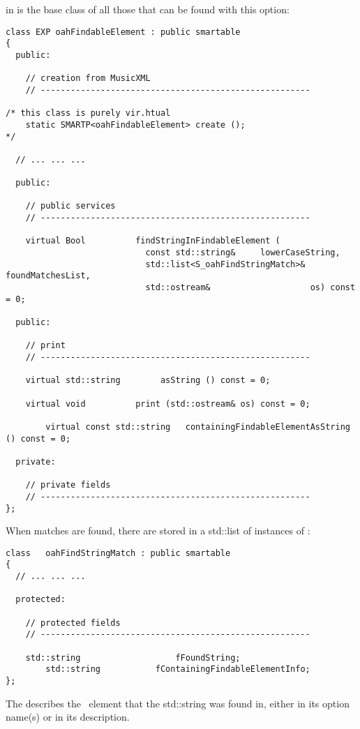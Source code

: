  in  is the base class   of all those that can be found with this  option:
\begin{lstlisting}[language=Terminal]
class EXP oahFindableElement : public smartable
{
  public:

    // creation from MusicXML
    // ------------------------------------------------------

/* this class is purely vir.htual
    static SMARTP<oahFindableElement> create ();
*/

  // ... ... ...

  public:

    // public services
    // ------------------------------------------------------

    virtual Bool          findStringInFindableElement (
                            const std::string&     lowerCaseString,
                            std::list<S_oahFindStringMatch>& foundMatchesList,
                            std::ostream&                    os) const = 0;

  public:

    // print
    // ------------------------------------------------------

    virtual std::string        asString () const = 0;

    virtual void          print (std::ostream& os) const = 0;

		virtual const std::string 	containingFindableElementAsString () const = 0;

  private:

    // private fields
    // ------------------------------------------------------
};
\end{lstlisting}

When matches are found, there are stored in a std::list of instances of :
\begin{lstlisting}[language=Terminal]
class   oahFindStringMatch : public smartable
{
  // ... ... ...

  protected:

    // protected fields
    // ------------------------------------------------------

    std::string			          fFoundString;
		std::string           fContainingFindableElementInfo;
};
\end{lstlisting}

The  describes the \oahRepr\ element that the std::string was found in, either in its option name(s) or in its description.

